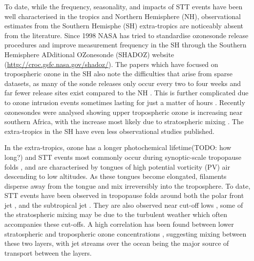 \documentclass{article}
\begin{document}
    To date, while the frequency, seasonality, and impacts of STT events have been well characterised in the tropics and Northern Hemisphere (NH), observational estimates from the Southern Hemisphe (SH) extra-tropics are noticeably absent from the literature. 
    Since 1998 NASA has tried to standardise ozonesonde release procedures and improve measurement frequency in the SH through the Southern Hemisphere ADditional OZonesonde (SHADOZ) website (\url{http://croc.gsfc.nasa.gov/shadoz/}).
    The papers which have focused on tropospheric ozone in the SH also note the difficulties that arise from sparse datasets, as many of the sonde releases only occur every two to four weeks and far fewer release sites exist compared to the NH \citep{Liu2015, Thompson2014, Mze2010}.
    This is further complicated due to ozone intrusion events sometimes lasting for just a matter of hours \citep{Tang2012}.
    Recently ozonesondes were analysed showing upper tropospheric ozone is increasing near southern Africa, with the increase most likely due to stratospheric mixing \citep{Liu2015, Thompson2014}. 
    The extra-tropics in the SH have even less observational studies published.
    
    In the extra-tropics, ozone has a longer photochemical lifetime(TODO: how long?) and STT events most commonly occur during synoptic-scale tropopause folds \citep{Sprenger2003, Tang2012}, and are characterised by tongues of high potential vorticity (PV) air descending to low altitudes.
    As these tongues become elongated, filaments disperse away from the tongue and mix irreversibly into the troposphere.
    To date, STT events have been observed in tropopause folds around both the polar front jet \citep{Vaughan1994, Beekmann1997}, and the subtropical jet \citep{Baray2000}.
    They are also observed near cut-off lows \citep{Price1993, Wirth1995}, some of the stratospheric mixing may be due to the turbulent weather which often accompanies these cut-offs.
    A high correlation has been found between lower stratospheric and tropospheric ozone concentrations \citep{Terao2008}, suggesting mixing between these two layers, with jet streams over the ocean being the major source of transport between the layers.
  
\end{document}
